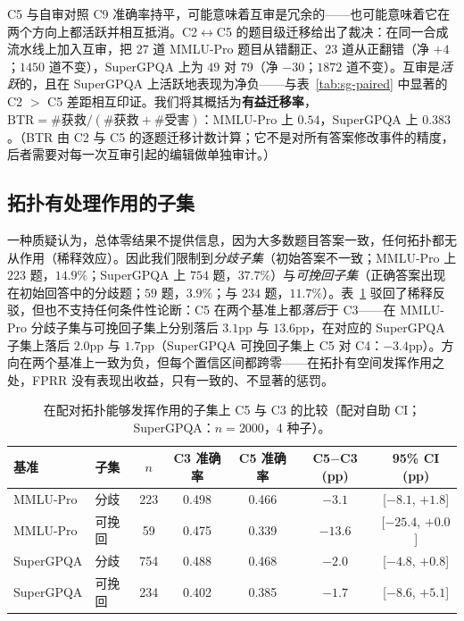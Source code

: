 \documentclass[UTF8,11pt]{ctexart}
\begin{document}
C5 与自审对照 C9 准确率持平，可能意味着互审是冗余的——也可能意味着它在两个方向上都活跃并相互抵消。C2$\leftrightarrow$C5 的题目级迁移给出了裁决：在同一合成流水线上加入互审，把 $27$ 道 MMLU-Pro 题目从错翻正、$23$ 道从正翻错（净 $+4$；$1450$ 道不变），SuperGPQA 上为 $49$ 对 $79$（净 $-30$；$1872$ 道不变）。互审是\emph{活跃}的，且在 SuperGPQA 上活跃地表现为净负——与表~\ref{tab:sg-paired} 中显著的 C2 $>$ C5 差距相互印证。我们将其概括为\textbf{有益迁移率}，$\mathrm{BTR} = \#\text{获救} / (\#\text{获救} + \#\text{受害})$：MMLU-Pro 上 $0.54$，SuperGPQA 上 $0.383$。（BTR 由 C2 与 C5 的逐题迁移计数计算；它不是对所有答案修改事件的精度，后者需要对每一次互审引起的编辑做单独审计。）

\subsection{拓扑有处理作用的子集}
\label{sec:subsets}

一种质疑认为，总体零结果不提供信息，因为大多数题目答案一致，任何拓扑都无从作用（稀释效应）。因此我们限制到\emph{分歧子集}（初始答案不一致；MMLU-Pro 上 $223$ 题，$14.9\%$；SuperGPQA 上 $754$ 题，$37.7\%$）与\emph{可挽回子集}（正确答案出现在初始回答中的分歧题；$59$ 题，$3.9\%$；与 $234$ 题，$11.7\%$）。表~\ref{tab:subsets} 驳回了稀释反驳，但也不支持任何条件性论断：C5 在两个基准上都\emph{落后}于 C3——在 MMLU-Pro 分歧子集与可挽回子集上分别落后 $3.1$pp 与 $13.6$pp，在对应的 SuperGPQA 子集上落后 $2.0$pp 与 $1.7$pp（SuperGPQA 可挽回子集上 C5 对 C4：$-3.4$pp）。方向在两个基准上一致为负，但每个置信区间都跨零——在拓扑有空间发挥作用之处，FPRR 没有表现出收益，只有一致的、不显著的惩罚。

\begin{table}[t]
\centering
\small
\caption{在配对拓扑能够发挥作用的子集上 C5 与 C3 的比较（配对自助 CI；SuperGPQA：$n=2000$，4 种子）。}
\label{tab:subsets}
\begin{tabular}{llccccc}
\toprule
基准 & 子集 & $n$ & C3 准确率 & C5 准确率 & C5$-$C3 (pp) & 95\% CI (pp) \\
\midrule
MMLU-Pro & 分歧    & 223 & 0.498 & 0.466 & $-3.1$ & [$-8.1$, $+1.8$] \\
MMLU-Pro & 可挽回  & 59  & 0.475 & 0.339 & $-13.6$ & [$-25.4$, $+0.0$] \\
SuperGPQA & 分歧   & 754 & 0.488 & 0.468 & $-2.0$ & [$-4.8$, $+0.8$] \\
SuperGPQA & 可挽回 & 234 & 0.402 & 0.385 & $-1.7$ & [$-8.6$, $+5.1$] \\
\bottomrule
\end{tabular}
\end{table}
\end{document}
